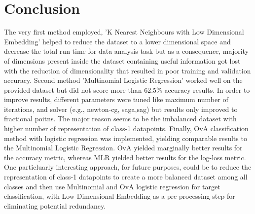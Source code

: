 \documentclass[journal]{IEEEtran}
\begin{document}
\section{Conclusion}
The very first method employed, 'K Nearest Neighbours with Low Dimensional Embedding' helped to reduce the dataset to a lower dimensional space and decrease the total run time for data analysis task but as a consequence, majority of dimensions present inside the dataset containing useful information got lost with the reduction of dimensionality that resulted in poor training and validation accuracy. Second method 'Multinomial Logistic Regression' worked well on the provided dataset but did not score more than 62.5\% accuracy results. In order to improve results, different parameters were tuned like maximum number of iterations, and solver (e.g., newton-cg, saga,sag) but results only improved to fractional poitns. The major reason seems to be the imbalanced dataset with higher number of representation of class-1 datapoints. Finally, OvA classification method with logistic regression was implemented, yielding comparable results to the Multinomial Logistic Regression. OvA yielded marginally better results for the accuracy metric, whereas MLR yielded better results for the log-loss metric. One particluarly interesting approach, for future purposes, could be to reduce the representation of class-1 datapoints to create a more balanced dataset among all classes and then use Multinomial and OvA logistic regression for target classification, with Low Dimensional Embedding as a pre-processing step for eliminating potential redundancy.
\par


\newpage


\end{document}
